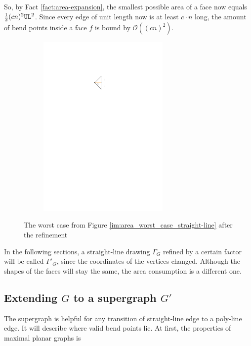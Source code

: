 \bigskip
So, by Fact \ref{fact:area-expansion}, the smallest possible area of a face now equals $\frac{1}{2}(cn)^2\texttt{UL}^2$. Since every edge of unit length now is at least $c \cdot n$ long, the amount of bend points inside a face $f$ is bound by $\mathcal{O}((cn)^2)$. 
\begin{figure}[H]
	\centering
	\begin{subfigure}{0.3\linewidth}
		\centering
		\includegraphics[width=0.7\textwidth,page=2]{drawings/maximal_planar.pdf}
	\end{subfigure}
	\caption{The worst case from Figure \ref{im:area_worst_case_straight-line} after the refinement}\label{im:c-n_worst_case_straight-line}
\end{figure}
In the following sections, a straight-line drawing $\Gamma_G$ refined by a certain factor will be called $\Gamma'_G$, since the coordinates of the vertices changed. Although the shapes of the faces will stay the same, the area consumption is a different one.


\subsection{Extending $G$ to a supergraph $G'$}
The supergraph is helpful for any transition of straight-line edge to a poly-line edge. It will describe where valid bend points lie. At first, the properties of maximal planar graphs is 


